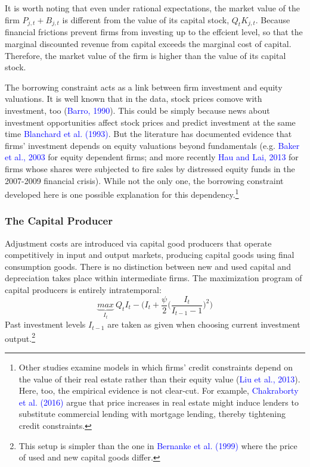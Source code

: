 \documentclass[cn,10pt,math=newtx,citestyle=gb7714-2015,bibstyle=gb7714-2015]{elegantbook}
\begin{document}
{{			It is worth noting that even under rational expectations, the market value of the firm $P_{j,t} + B_{j,t}$ is different from the value of its capital stock, $Q_tK_{j,t}$. Because financial frictions prevent firms from investing up to the effcient level, so that the marginal discounted revenue from capital exceeds the
			marginal cost of capital. Therefore, the market value of the firm is higher than the value of its capital stock.
			
			The borrowing constraint acts as a link between firm investment and equity valuations. It is well known that in the data, stock prices comove with investment, too (\textcolor{blue}{Barro, 1990}). This could be simply because news about investment opportunities affect stock prices and predict investment
			at the same time \textcolor{blue}{Blanchard et al. (1993)}. But the literature has documented evidence that firms' investment depends on equity valuations beyond fundamentals (e.g. \textcolor{blue}{Baker et al., 2003} for equity dependent firms; and more recently \textcolor{blue}{Hau and Lai, 2013} for firms whose shares were subjected to fire sales by distressed equity funds in the 2007-2009 financial crisis). While not the only one, the borrowing constraint developed here is one possible explanation for this dependency.\footnote{Other studies examine models in which firms' credit constraints depend on the value of their real estate rather than their equity value (\textcolor{blue}{Liu et al., 2013}). Here, too, the empirical evidence is not clear-cut. For example, \textcolor{blue}{Chakraborty et al. (2016)} argue that price increases in real estate might induce lenders to substitute commercial lending with mortgage lending, thereby tightening credit constraints.}
			
			\subsubsection{The Capital Producer}
			Adjustment costs are introduced via capital good producers that operate competitively in input and output markets, producing capital goods using final consumption goods. There is no distinction between new and used capital and depreciation takes place within intermediate firms. The maximization program of capital producers is entirely intratemporal:
			\begin{equation*}
				\underbrace{max}_{I_t}~Q_tI_t-\bigg(I_t+\frac{\psi}{2}\big(\frac{I_t}{I_{t-1}-1}\big)^2\bigg)
			\end{equation*}
			Past investment levels $I_{t-1}$ are taken as given when choosing current investment output.\footnote{This setup is simpler than the one in \textcolor{blue}{Bernanke et al. (1999)} where the price of used and new capital goods differ.}
			
}}
\end{document}
